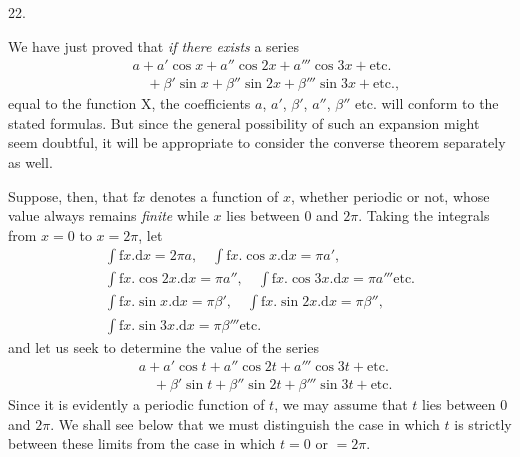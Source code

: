 \par{}\bigskip
{}
\begin{center}22.\end{center}
\begingroup
\makeatletter\tagsleft@true\let\veqno\@@leqno\makeatother
\setlength{\lineskip}{4pt}\setlength{\lineskiplimit}{4pt}
\noindent\hspace*{\parindent}We have just proved that \textit{if there exists} a series
\[
\begin{aligned}
&a+a'\cos x+a''\cos2x+a'''\cos3x+\text{etc.}\\
&\quad{}+\beta'\sin x+\beta''\sin2x+\beta'''\sin3x+\text{etc.,}
\end{aligned}
\]
\noindent equal to the function \(\mathrm{X}\), the coefficients \(a\), \(a'\), \(\beta'\), \(a''\), \(\beta''\) etc. will conform to the stated formulas. But since the general possibility of such an expansion might seem doubtful, it will be appropriate to consider the converse theorem separately as well.
\par
Suppose, then, that \(\mathrm{f}x\) denotes a function of \(x\), whether periodic or not, whose value always remains \textit{finite} while \(x\) lies between \(0\) and \(2\pi\). Taking the integrals from \(x=0\) to \(x=2\pi\), let
\[
\begin{gathered}
\int\mathrm{f}x.\mathrm{d}x=2\pi a,\quad\int\mathrm{f}x.\cos x.\mathrm{d}x=\pi a',\\[3pt]
\int\mathrm{f}x.\cos2x.\mathrm{d}x=\pi a'',\quad\int\mathrm{f}x.\cos3x.\mathrm{d}x=\pi a'''\text{etc.}\\[3pt]
\int\mathrm{f}x.\sin x.\mathrm{d}x=\pi\beta',\quad\int\mathrm{f}x.\sin2x.\mathrm{d}x=\pi\beta'',\\[3pt]
\int\mathrm{f}x.\sin3x.\mathrm{d}x=\pi\beta'''\text{etc.}
\end{gathered}
\]
\noindent and let us seek to determine the value of the series
\[
\tag*{(T)}\begin{aligned}
&a+a'\cos t+a''\cos2t+a'''\cos3t+\text{etc.}\\
&\quad{}+\beta'\sin t+\beta''\sin2t+\beta'''\sin3t+\text{etc.}
\end{aligned}
\]
\noindent Since it is evidently a periodic function of \(t\), we may assume that \(t\) lies between \(0\) and \(2\pi\). We shall see below that we must distinguish the case in which \(t\) is strictly between these limits from the case in which \(t=0\) or \(=2\pi\).
\par
